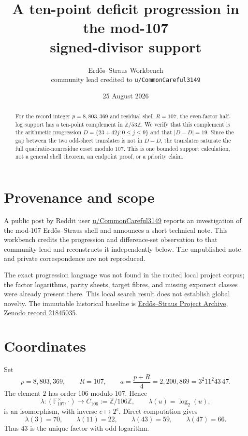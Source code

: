 \documentclass[11pt]{article}
\title{A ten-point deficit progression in the mod-107\\
signed-divisor support}
\author{Erd\H{o}s--Straus Workbench\\
community lead credited to \texttt{u/CommonCareful3149}}
\date{25 August 2026}
\begin{document}
\maketitle

\begin{abstract}
For the record integer $p=8{,}803{,}369$ and residual shell $R=107$, the
even-factor half-log support has a ten-point complement in
$\mathbb Z/53\mathbb Z$.  We verify that this complement is the arithmetic
progression $D=\{23+42j:0\leq j\leq9\}$ and that $|D-D|=19$.  Since the gap
between the two odd-sheet translates is not in $D-D$, the translates saturate
the full quadratic-nonresidue coset modulo $107$.  This is one bounded support
calculation, not a general shell theorem, an endpoint proof, or a priority
claim.
\end{abstract}

\section{Provenance and scope}

A public post by Reddit user
\href{https://www.reddit.com/r/LLMmathematics/comments/1vy127z/}
{u/CommonCareful3149} reports an investigation of the mod-$107$
Erd\H{o}s--Straus shell and announces a short technical note.  This workbench
credits the progression and difference-set observation to that community lead and
reconstructs it independently below.  The unpublished note and private
correspondence are not reproduced.

The exact progression language was not found in the routed local project
corpus; the factor logarithms, parity sheets, target fibres, and missing
exponent classes were already present there.  This local search result does
not establish global novelty.  The immutable historical baseline is
\href{https://zenodo.org/records/21845035}{Erd\H{o}s--Straus Project Archive,
Zenodo record 21845035}.

\section{Coordinates}

Set
\[
p=8{,}803{,}369,
\qquad R=107,
\qquad a=\frac{p+R}{4}=2{,}200{,}869=3^2 11^2 43\,47.
\]
The element $2$ has order $106$ modulo $107$.  Hence
\[
\lambda:(\mathbb F_{107}^{\times},\cdot)\longrightarrow
 C_{106}:=\mathbb Z/106\mathbb Z,
\qquad \lambda(u)=\log_2(u),
\]
is an isomorphism, with inverse $e\mapsto2^e$.  Direct computation gives
\begin{equation}
 \lambda(3)=70,\qquad \lambda(11)=22,\qquad
 \lambda(43)=59,\qquad \lambda(47)=66.
 \label{eq:logs}
\end{equation}
Thus $43$ is the unique factor with odd logarithm.
\end{document}
